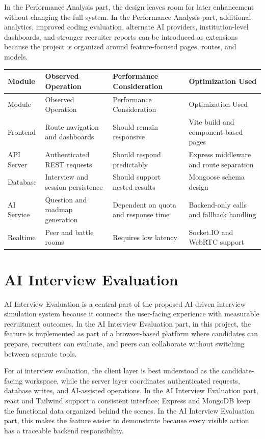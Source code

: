 \documentclass[12pt,a4paper]{report}
\begin{document}
In the Performance Analysis part, the design leaves room for later enhancement without changing the full system. In the Performance Analysis part, additional analytics, improved coding evaluation, alternate AI providers, institution-level dashboards, and stronger recruiter reports can be introduced as extensions because the project is organized around feature-focused pages, routes, and models.


\begin{longtable}{|>{\raggedright\arraybackslash}p{}|>{\raggedright\arraybackslash}p{}|>{\raggedright\arraybackslash}p{}|>{\raggedright\arraybackslash}p{}|}
\hline
Module & Observed Operation & Performance Consideration & Optimization Used \\
\hline
\endfirsthead
\hline
Module & Observed Operation & Performance Consideration & Optimization Used \\
\hline
\endhead
Frontend & Route navigation and dashboards & Should remain responsive & Vite build and component-based pages \\
\hline
API Server & Authenticated REST requests & Should respond predictably & Express middleware and route separation \\
\hline
Database & Interview and session persistence & Should support nested results & Mongoose schema design \\
\hline
AI Service & Question and roadmap generation & Dependent on quota and response time & Backend-only calls and fallback handling \\
\hline
Realtime & Peer and battle rooms & Requires low latency & Socket.IO and WebRTC support \\
\hline
\end{longtable}

\section{AI Interview Evaluation}

AI Interview Evaluation is a central part of the proposed AI-driven interview simulation system because it connects the user-facing experience with measurable recruitment outcomes. In the AI Interview Evaluation part, in this project, the feature is implemented as part of a browser-based platform where candidates can prepare, recruiters can evaluate, and peers can collaborate without switching between separate tools.


For ai interview evaluation, the client layer is best understood as the candidate-facing workspace, while the server layer coordinates authenticated requests, database writes, and AI-assisted operations. In the AI Interview Evaluation part, react and Tailwind support a consistent interface; Express and MongoDB keep the functional data organized behind the scenes. In the AI Interview Evaluation part, this makes the feature easier to demonstrate because every visible action has a traceable backend responsibility.
\end{document}
